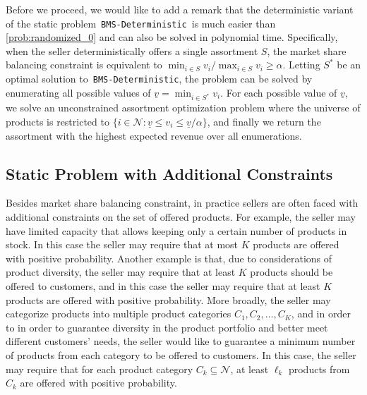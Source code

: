 \documentclass[mnsc,non-blindrev]{informs3}
\theoremstyle{definition}
\begin{document}
\vspace{0.5em}

Before we proceed, we would like to add a remark that the deterministic variant of the static problem~\texttt{BMS-Deterministic}~is much easier than \ref{prob:randomized_0} and can also be solved in polynomial time. Specifically, when the seller deterministically offers a single assortment $S$, the market share balancing constraint is equivalent to $\min_{i\in S}v_i / \max_{i\in S}v_i\geq \alpha$. Letting $S^*$ be an optimal solution to~\texttt{BMS-Deterministic}, the problem can be solved by enumerating all possible values of $\underline{v}=\min_{i\in S^*}v_i$. For each possible value of $\underline{v}$,  we solve an unconstrained assortment optimization problem where the universe of products is restricted to $\{i\in\mathcal{N}:\underline{v}\leq v_i\leq \underline{v}/\alpha\}$, and finally we return the assortment with the highest expected revenue over all enumerations. 

\subsection{Static Problem with Additional Constraints}\label{sec:randomized_constrained}

Besides market share balancing constraint, in practice sellers are often faced with additional constraints on the set of offered products. For example, the seller may have limited capacity that allows keeping only a certain number of products in stock. In this case the seller may require that at most $K$ products are offered with positive probability. {  Another example is that, due to considerations of product diversity, the seller may require that at least $K$ products should be offered to customers, and in this case the seller may require that at least $K$ products are offered with positive probability. More broadly, the seller may categorize products into multiple product categories $C_1,C_2,\dots,C_K$, and in order to in order to guarantee diversity in the product portfolio and better meet different customers' needs, the seller would like to guarantee a minimum number of products from each category to be offered to customers. In this case, the seller may require that for each product category $C_k\subseteq\mathcal{N}$, at least $\ell_k$ products from $C_k$ are offered with positive probability.}
\end{document}
